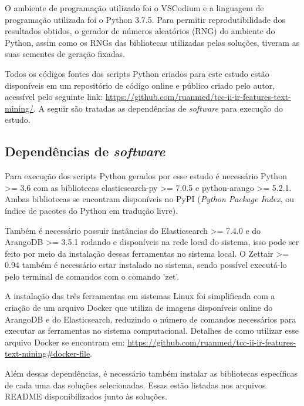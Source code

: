 		O ambiente de programação utilizado foi o VSCodium e a linguagem de programação utilizada foi o Python 3.7.5.
		Para permitir reprodutibilidade dos resultados obtidos, o gerador de números aleatórios (RNG) do ambiente do Python, assim como os RNGs das bibliotecas utilizadas pelas soluções, tiveram as suas sementes de geração fixadas.

		Todos os códigos fontes dos scripts Python criados para este estudo estão disponíveis em um repositório de código online e público criado pelo autor, acessível pelo seguinte link: \hyperlink{https://github.com/ruanmed/tcc-ii-ir-features-text-mining/}{https://github.com/ruanmed/tcc-ii-ir-features-text-mining/}.
		A seguir são tratadas as dependências de \textit{software} para execução do estudo.

		\subsection{Dependências de \textit{software}} \label{subsec:DependênciasSoftware}
			Para execução dos scripts Python gerados por esse estudo é necessário Python >= 3.6 com as bibliotecas elasticsearch-py >= 7.0.5 e python-arango >= 5.2.1.
			Ambas bibliotecas se encontram disponíveis no PyPI (\textit{Python Package Index}, ou índice de pacotes do Python em tradução livre).

			Também é necessário possuir instâncias do Elasticsearch >= 7.4.0 e do ArangoDB >= 3.5.1 rodando e disponíveis na rede local do sistema, isso pode ser feito por meio da instalação dessas ferramentas no sistema local.
			O Zettair >= 0.94 também é necessário estar instalado no sistema, sendo possível executá-lo pelo terminal de comandos com o comando 'zet'.

			A instalação das três ferramentas em sistemas Linux foi simplificada com a criação de um arquivo Docker que utiliza de imagens disponíveis online do ArangoDB e do Elasticsearch, reduzindo o número de comandos necessários para executar as ferramentas no sistema computacional.
			Detalhes de como utilizar esse arquivo Docker se encontram em: \hyperlink{https://github.com/ruanmed/tcc-ii-ir-features-text-mining\#docker-file}{https://github.com/ruanmed/tcc-ii-ir-features-text-mining\#docker-file}.

			Além dessas dependências, é necessário também instalar as bibliotecas específicas de cada uma das soluções selecionadas.
			Essas estão listadas nos arquivos README disponibilizados junto às soluções.

